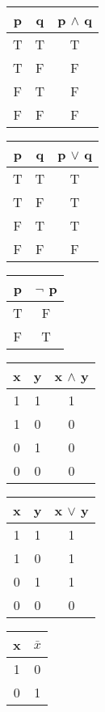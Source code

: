 \documentclass{book}[oneside]
\begin{document}
\begin{CJK*}{UTF8}{gbsn}
\begin{tabular}{cc|c}
    p& q& p $\land$ q\\
    \hline
    T&T&T\\
    T&F&F\\
    F&T&F\\
    F&F&F\\
  \end{tabular}\hspace{1cm}
  \begin{tabular}{cc|c}
    p& q& p $\lor$ q\\
    \hline
    T&T&T\\
    T&F&T\\
    F&T&T\\
    F&F&F\\
  \end{tabular}\hspace{1cm}
  \begin{tabular}{c|c}
    p& $\lnot$ p\\
    \hline
    T&F\\
    F&T\\
  \end{tabular}

  \vspace{1cm}
    \begin{tabular}{cc|c}
    x& y& x $\land$ y\\
    \hline
    1&1&1\\
    1&0&0\\
    0&1&0\\
    0&0&0\\
  \end{tabular}\hspace{1cm}
  \begin{tabular}{cc|c}
    x& y& x $\lor$ y\\
    \hline
    1&1&1\\
    1&0&1\\
    0&1&1\\
    0&0&0\\
  \end{tabular}\hspace{1cm}
  \begin{tabular}{c|c}
    x& $\bar{x}$\\
    \hline
    1&0\\
    0&1\\
  \end{tabular}
  

\end{CJK*}
\end{document}
